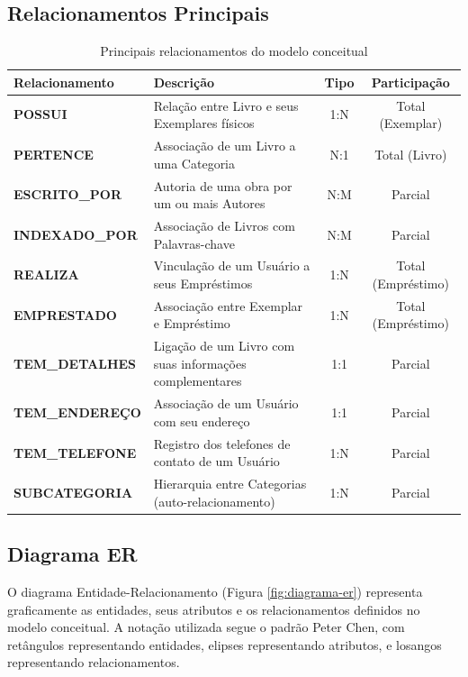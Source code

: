 \documentclass[12pt,a4paper]{article}
\begin{document}
\subsection{Relacionamentos Principais}

\begin{infobox}
\begin{table}[H]
\centering
\begin{tabularx}{\textwidth}{>{\bfseries}lXcc}
\toprule
\textbf{Relacionamento} & \textbf{Descrição} & \textbf{Tipo} & \textbf{Participação} \\
\midrule
POSSUI & Relação entre Livro e seus Exemplares físicos & 1:N & Total (Exemplar) \\
\addlinespace
PERTENCE & Associação de um Livro a uma Categoria & N:1 & Total (Livro) \\
\addlinespace
ESCRITO\_POR & Autoria de uma obra por um ou mais Autores & N:M & Parcial \\
\addlinespace
INDEXADO\_POR & Associação de Livros com Palavras-chave & N:M & Parcial \\
\addlinespace
REALIZA & Vinculação de um Usuário a seus Empréstimos & 1:N & Total (Empréstimo) \\
\addlinespace
EMPRESTADO & Associação entre Exemplar e Empréstimo & 1:N & Total (Empréstimo) \\
\addlinespace
TEM\_DETALHES & Ligação de um Livro com suas informações complementares & 1:1 & Parcial \\
\addlinespace
TEM\_ENDEREÇO & Associação de um Usuário com seu endereço & 1:1 & Parcial \\
\addlinespace
TEM\_TELEFONE & Registro dos telefones de contato de um Usuário & 1:N & Parcial \\
\addlinespace
SUBCATEGORIA & Hierarquia entre Categorias (auto-relacionamento) & 1:N & Parcial \\
\bottomrule
\end{tabularx}
\caption{Principais relacionamentos do modelo conceitual}
\label{tab:relacionamentos}
\end{table}
\end{infobox}

\subsection{Diagrama ER}

O diagrama Entidade-Relacionamento (Figura \ref{fig:diagrama-er}) representa graficamente as entidades, seus atributos e os relacionamentos definidos no modelo conceitual. A notação utilizada segue o padrão Peter Chen, com retângulos representando entidades, elipses representando atributos, e losangos representando relacionamentos.
\end{document}
